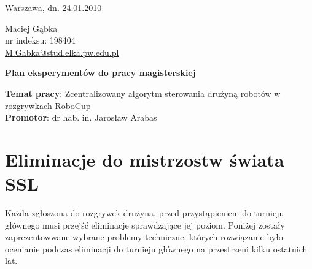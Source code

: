\documentclass[11pt,onecolumn,a4paper,final]{article}
\begin{document}
 

\begin{flushright}
	Warszawa, dn. 24.01.2010
\end{flushright}

\vspace{-1.45cm}

\begin{flushleft}
	Maciej Gąbka \\  nr indeksu: 198404 \\ \url{M.Gabka@stud.elka.pw.edu.pl}
\end{flushleft}

\vspace{0.5cm}

\begin{center}
	\LARGE \bfseries Plan eksperymentów do pracy magisterskiej \\
\end{center}

\vspace{1cm}

\begin{center}
\textbf{Temat pracy}: Zcentralizowany algorytm sterowania drużyną robotów w rozgrywkach RoboCup\\
\textbf{Promotor}: dr hab. in. Jarosław Arabas\
\end{center}

\section*{Eliminacje do mistrzostw świata SSL}
Każda zgłoszona do rozgrywek drużyna, przed przystąpieniem do turnieju głównego musi przejść eliminacje sprawdzające jej poziom.
Poniżej zostały zaprezentowwane wybrane problemy techniczne, których rozwiązanie było ocenianie podczas eliminacji do turnieju głównego na przestrzeni
kilku ostatnich lat\cite{robocup_www}.
\end{document}
